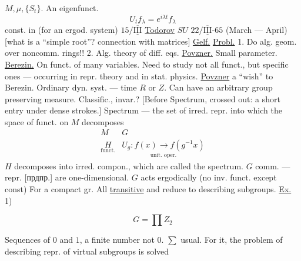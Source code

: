 $M,\mu,\{S_t\}$.
An eigenfunct.
\begin{equation*}
U_t f_\lambda=e^{i\lambda t}f_\lambda
\end{equation*}
const. in  (for an ergod. system)
$15/\overline{\underline{\mathrm{III}}}$ \underline{Todorov} $SU$
$22/\overline{\underline{\mathrm{III}}}$-$65$ 
(March --- April)
[what is a ``simple root''? connection with matrices]
\underline{Gelf.} \underline{Probl.}
1. Do alg. geom. over noncomm. rings!!
2. Alg. theory of diff. eqs.
\underline{Povzner.} Small parameter.
\underline{Berezin.} On funct. of many variables.
Need to study not all funct., but specific ones --- occurring in repr. theory and
in stat. physics.
\underline{Povzner} a ``wish'' to Berezin.
Ordinary dyn. syst. --- time $R$ or $Z$. Can have
an arbitrary group preserving measure. Classific., invar.?
[Before Spectrum, crossed out: a short entry under dense strokes.]
Spectrum --- the set of irred. repr. into which
the space of funct. on $M$ decomposes
\begin{equation*}
\begin{array}{ll}
M&G\\
\underset{\text{funct.}}{H}&\underset{\text{unit. oper.}}{U_g:f(x)\longrightarrow f(g^{-1}x)}
\end{array}
\end{equation*}
$H$ decomposes into irred. compon., which are called the spectrum.
$G$ comm. --- repr. [прдпр.] are one-dimensional.
$G$ acts ergodically (no inv. funct. except const)
For a compact gr. All \underline{transitive} and reduce to describing
subgroups.
\underline{Ex.} 1) 
\par\noindent\begin{minipage}{\linewidth}
\begin{equation*}
G=\prod Z_2
\end{equation*}
\end{minipage}\par
{}
Sequences of $0$ and $1$, a finite number not $0$.
$\sum$ usual.
For it, the problem of describing repr. of virtual subgroups is solved

